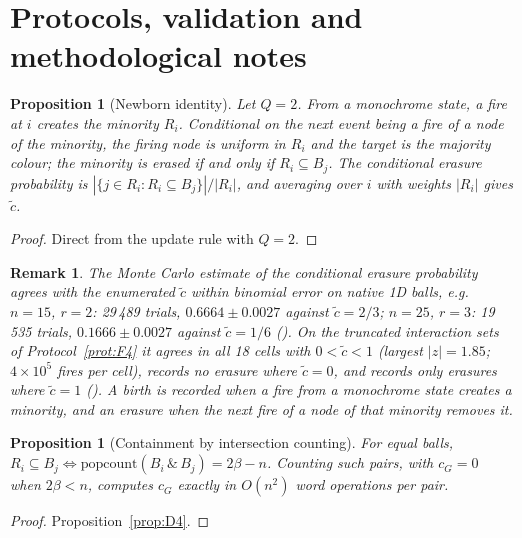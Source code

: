 \documentclass[pdflatex,sn-mathphys-num]{sn-jnl}
\newcommand{\NewbornInterior}{18}
\newcommand{\NewbornMaxZ}{1.85}
\theoremstyle{thmstyleone}%
\newtheorem{proposition}[theorem]{Proposition}
\theoremstyle{thmstylethree}%
\theoremstyle{thmstyletwo}%
\newtheorem{remark}{Remark}[theorem]
\newcommand{\ctil}{\tilde{c}}
\newcommand{\cG}{c_G}
\begin{document}
\section{Protocols, validation and methodological notes}
\label{sec:F}

\begin{proposition}[Newborn identity]
\label{prop:F1}
Let $Q=2$. From a monochrome state, a fire at $i$ creates the minority
$R_i$. Conditional on the next event being a fire of a node of the
minority, the firing node is uniform in $R_i$ and the target is the
majority colour; the minority is erased if and only if $R_i\subseteq B_j$.
The conditional erasure probability is
$|\{j\in R_i:R_i\subseteq B_j\}|/|R_i|$, and averaging over $i$ with
weights $|R_i|$ gives $\ctil$.
\end{proposition}
\begin{proof}
Direct from the update rule with $Q=2$.
\end{proof}
\begin{remark}
\label{rem:F1.1}
The Monte Carlo estimate of the conditional erasure probability agrees
with the enumerated $\ctil$ within binomial error on native 1D balls,
e.g.\ $n=15$, $r=2$: 29\,489 trials, $0.6664\pm0.0027$ against
$\ctil=2/3$; $n=25$, $r=3$: 19\,535 trials, $0.1666\pm0.0027$ against
$\ctil=1/6$ (). On the truncated
interaction sets of Protocol~\ref{prot:F4} it agrees in all
\NewbornInterior{} cells with $0<\ctil<1$ (largest $|z|=\NewbornMaxZ$;
$4\times10^5$ fires per cell), records no erasure where $\ctil=0$, and
records only erasures where $\ctil=1$
(). A birth is
recorded when a fire from a monochrome state creates a minority, and an
erasure when the next fire of a node of that minority removes it.
\end{remark}

\begin{proposition}[Containment by intersection counting]
\label{prop:F2}
For equal balls, $R_i\subseteq B_j\iff\mathrm{popcount}(B_i\,\&\,B_j)
=2\beta-n$. Counting such pairs, with $\cG=0$ when $2\beta<n$, computes
$\cG$ exactly in $O(n^2)$ word operations per pair.
\end{proposition}
\begin{proof}
Proposition~\ref{prop:D4}.
\end{proof}
\end{document}

